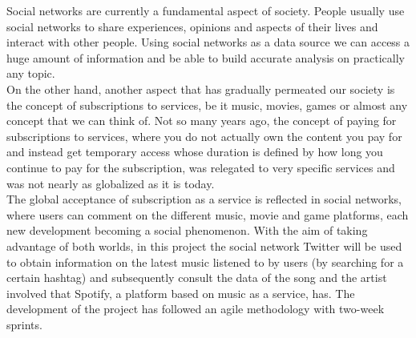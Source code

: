 

\nonzeroparskip Social networks are currently a fundamental aspect of society. People usually use social networks to share experiences, opinions and aspects of their lives and interact with other people. Using social networks as a data source we can access a huge amount of information and be able to build accurate analysis on practically any topic.\\

\nonzeroparskip On the other hand, another aspect that has gradually permeated our society is the concept of subscriptions to services, be it music, movies, games or almost any concept that we can think of. Not so many years ago, the concept of paying for subscriptions to services, where you do not actually own the content you pay for and instead get temporary access whose duration is defined by how long you continue to pay for the subscription, was relegated to very specific services and was not nearly as globalized as it is today.\\

\nonzeroparskip The global acceptance of subscription as a service is reflected in social networks, where users can comment on the different music, movie and game platforms, each new development becoming a social phenomenon. With the aim of taking advantage of both worlds, in this project the social network Twitter will be used to obtain information on the latest music listened to by users (by searching for a certain hashtag) and subsequently consult the data of the song and the artist involved that Spotify, a platform based on music as a service, has. The development of the project has followed an agile methodology with two-week sprints.

